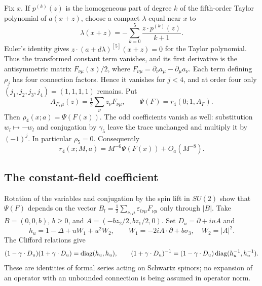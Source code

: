 Fix $x$. If $p^{(k)}(z)$ is the homogeneous part of degree $k$ of
the fifth-order Taylor polynomial of $a(x+z)$, choose a compact
$\lambda$ equal near $x$ to
\[
 \lambda(x+z)=-\sum_{k=0}^5\frac{z\cdot p^{(k)}(z)}{k+1}.
\]
Euler's identity gives $z\cdot(a+d\lambda)^{[5]}(x+z)=0$ for
the Taylor polynomial. Thus the transformed constant term vanishes,
and its first derivative is the antisymmetric matrix
$F_{\nu\mu}(x)/2$, where
$F_{\nu\mu}=\partial_\nu a_\mu-\partial_\mu a_\nu$.
Each term defining $\rho_j$ has four connection factors. Hence it
vanishes for $j<4$, and at order four only $(j_1,j_2,j_3,j_4)=(1,1,1,1)$
remains. Put
\[
 A_{F,\mu}(z)=\tfrac12\sum_\nu z_\nu F_{\nu\mu},\qquad
 \Psi(F)=r_4(0;1,A_F).
\]
Then $\rho_4(x;a)=\Psi(F(x))$. The odd coefficients vanish as well:
substitution $w_l\mapsto-w_l$ and conjugation by $\gamma_5$ leave
the trace unchanged and multiply it by $(-1)^j$. In particular
$\rho_5=0$. Consequently
\begin{equation}\label{eq:probe-field-strength-reduction}
 r_4(x;M,a)=M^{-6}\Psi(F(x))+O_a(M^{-8}).
\end{equation}

\subsection{The constant-field coefficient}

Rotation of the variables and conjugation by the spin lift in $SU(2)$
show that $\Psi(F)$ depends on the vector
$B_l=\tfrac12\sum_{\nu,\mu}\varepsilon_{l\nu\mu}F_{\nu\mu}$ only
through $|B|$. Take $B=(0,0,b)$, $b\ge0$, and
$A=(-bz_2/2,bz_1/2,0)$. Set $D_u=\partial+iuA$ and
\[
 h_u=1-\Delta+uW_1+u^2W_2,\qquad
 W_1=-2iA\cdot\partial+b\sigma_3,\quad
 W_2=|A|^2.
\]
The Clifford relations give
\begin{equation}\label{eq:probe-squared-dirac}
 (1-\gamma\cdot D_u)(1+\gamma\cdot D_u)
   =\operatorname{diag}(h_u,h_u),\qquad
 (1+\gamma\cdot D_u)^{-1}
   =(1-\gamma\cdot D_u)\operatorname{diag}(h_u^{-1},h_u^{-1}).
\end{equation}
These are identities of formal series acting on Schwartz spinors;
no expansion of an operator with an unbounded connection is being
assumed in operator norm.


